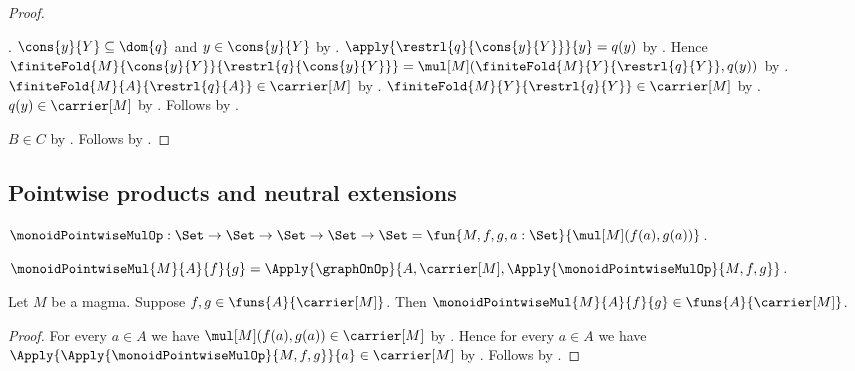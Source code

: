 \begin{proof}
\begin{subproof}
\begin{subproof}
\begin{byCase}
                    .
                $\cons{y}{Y}\subseteq\dom{q}$ and
                    $y\in\cons{y}{Y}$ by
                    .
                $\apply{\restrl{q}{\cons{y}{Y}}}{y}=q(y)$ by
                    .
                Hence
                    $\finiteFold{M}{\cons{y}{Y}}{
                            \restrl{q}{\cons{y}{Y}}}
                    =\mul[M](
                        \finiteFold{M}{Y}{\restrl{q}{Y}},q(y))$ by
                    .
                $\finiteFold{M}{A}{\restrl{q}{A}}\in\carrier[M]$ by
                    .
                $\finiteFold{M}{Y}{\restrl{q}{Y}}\in\carrier[M]$ by
                    .
                $q(y)\in\carrier[M]$ by
                    .
                Follows by .
            \end{byCase}
        \end{subproof}
    \end{subproof}
    $B\in C$ by .
    Follows by .
\end{proof}

\subsection{Pointwise products and neutral extensions}

\begin{definition}\label{monoid_pointwise_mul_op}
    $\monoidPointwiseMulOp:
        \Set\to\Set\to\Set\to\Set\to\Set
        =\fun{M,f,g,a:\Set}{\mul[M](f(a),g(a))}$.
\end{definition}

\begin{definition}\label{monoid_pointwise_mul}
    $\monoidPointwiseMul{M}{A}{f}{g}
        =\Apply{\graphOnOp}{
            A,\carrier[M],\Apply{\monoidPointwiseMulOp}{M,f,g}}$.
\end{definition}

\begin{proposition}\label{monoid_pointwise_mul_type}
    Let $M$ be a magma.
    Suppose $f,g\in\funs{A}{\carrier[M]}$.
    Then $\monoidPointwiseMul{M}{A}{f}{g}
        \in\funs{A}{\carrier[M]}$.
\end{proposition}
\begin{proof}
    For every $a\in A$ we have
        $\mul[M](f(a),g(a))\in\carrier[M]$ by
        .
    Hence for every $a\in A$ we have
        $\Apply{\Apply{\monoidPointwiseMulOp}{M,f,g}}{a}
            \in\carrier[M]$ by .
    Follows by
        .
\end{proof}


